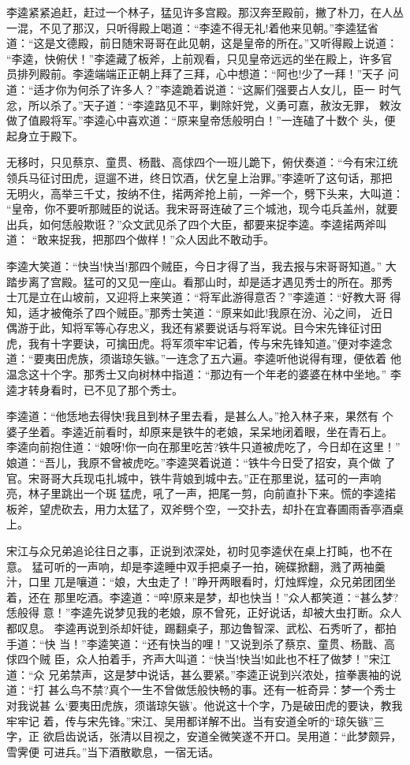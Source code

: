 李逵紧紧追赶，赶过一个林子，猛见许多宫殿。那汉奔至殿前，撇了朴刀，在人丛
一混，不见了那汉，只听得殿上喝道：“李逵不得无礼!着他来见朝。”李逵猛省
道：“这是文德殿，前日随宋哥哥在此见朝，这是皇帝的所在。”又听得殿上说道：
“李逵，快俯伏！”李逵藏了板斧，上前观看，只见皇帝远远的坐在殿上，许多官
员排列殿前。李逵端端正正朝上拜了三拜，心中想道：“阿也!少了一拜！”天子
问道：“适才你为何杀了许多人？”李逵跪着说道：“这厮们强要占人女儿，臣一
时气忿，所以杀了。”天子道：“李逵路见不平，剿除奸党，义勇可嘉，赦汝无罪，
敕汝做了值殿将军。”李逵心中喜欢道：“原来皇帝恁般明白！”一连磕了十数个
头，便起身立于殿下。

无移时，只见蔡京、童贯、杨戬、高俅四个一班儿跪下，俯伏奏道：“今有宋江统
领兵马征讨田虎，逗遛不进，终日饮酒，伏乞皇上治罪。”李逵听了这句话，那把
无明火，高举三千丈，按纳不住，掿两斧抢上前，一斧一个，劈下头来，大叫道：
“皇帝，你不要听那贼臣的说话。我宋哥哥连破了三个城池，现今屯兵盖州，就要
出兵，如何恁般欺诳？”众文武见杀了四个大臣，都要来捉李逵。李逵掿两斧叫道：
“敢来捉我，把那四个做样！”众人因此不敢动手。

李逵大笑道：“快当!快当!那四个贼臣，今日才得了当，我去报与宋哥哥知道。”
大踏步离了宫殿。猛可的又见一座山。看那山时，却是适才遇见秀士的所在。那秀
士兀是立在山坡前，又迎将上来笑道：“将军此游得意否？”李逵道：“好教大哥
得知，适才被俺杀了四个贼臣。”那秀士笑道：“原来如此!我原在汾、沁之间，
近日偶游于此，知将军等心存忠义，我还有紧要说话与将军说。目今宋先锋征讨田
虎，我有十字要诀，可擒田虎。将军须牢牢记着，传与宋先锋知道。”便对李逵念
道：“要夷田虎族，须谐琼矢镞。”一连念了五六遍。李逵听他说得有理，便依着
他温念这十个字。那秀士又向树林中指道：“那边有一个年老的婆婆在林中坐地。”
李逵才转身看时，已不见了那个秀士。

李逵道：“他恁地去得快!我且到林子里去看，是甚么人。”抢入林子来，果然有
个婆子坐着。李逵近前看时，却原来是铁牛的老娘，呆呆地闭着眼，坐在青石上。
李逵向前抱住道：“娘呀!你一向在那里吃苦?铁牛只道被虎吃了，今日却在这里！”
娘道：“吾儿，我原不曾被虎吃。”李逵哭着说道：“铁牛今日受了招安，真个做
了官。宋哥哥大兵现屯扎城中，铁牛背娘到城中去。”正在那里说，猛可的一声响
亮，林子里跳出一个斑猛虎，吼了一声，把尾一剪，向前直扑下来。慌的李逵掿
板斧，望虎砍去，用力太猛了，双斧劈个空，一交扑去，却扑在宜春圃雨香亭酒桌
上。

宋江与众兄弟追论往日之事，正说到浓深处，初时见李逵伏在桌上打盹，也不在意。
猛可听的一声响，却是李逵睡中双手把桌子一拍，碗碟掀翻，溅了两袖羹汁，口里
兀是嚷道：“娘，大虫走了！”睁开两眼看时，灯烛辉煌，众兄弟团团坐着，还在
那里吃酒。李逵道：“啐!原来是梦，却也快当！”众人都笑道：“甚么梦?恁般得
意！”李逵先说梦见我的老娘，原不曾死，正好说话，却被大虫打断。众人都叹息。
李逵再说到杀却奸徒，踢翻桌子，那边鲁智深、武松、石秀听了，都拍手道：“快
当！”李逵笑道：“还有快当的哩！”又说到杀了蔡京、童贯、杨戬、高俅四个贼
臣，众人拍着手，齐声大叫道：“快当!快当!如此也不枉了做梦！”宋江道：“众
兄弟禁声，这是梦中说话，甚么要紧。”李逵正说到兴浓处，揎拳裹袖的说道：“打
甚么鸟不禁?真个一生不曾做恁般快畅的事。还有一桩奇异：梦一个秀士对我说甚
么‘要夷田虎族，须谐琼矢镞’。他说这十个字，乃是破田虎的要诀，教我牢牢记
着，传与宋先锋。”宋江、吴用都详解不出。当有安道全听的“琼矢镞”三字，正
欲启齿说话，张清以目视之，安道全微笑遂不开口。吴用道：“此梦颇异，雪霁便
可进兵。”当下酒散歇息，一宿无话。

